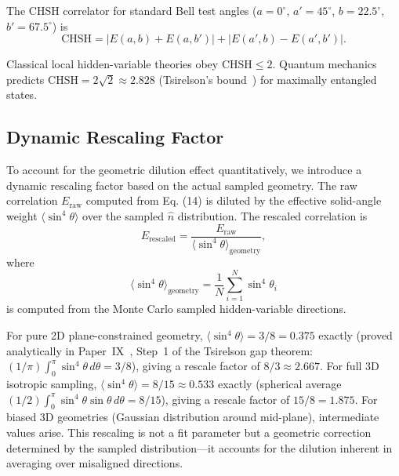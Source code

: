 The CHSH correlator for standard Bell test angles ($a=0^\circ$, $a'=45^\circ$, $b=22.5^\circ$, $b'=67.5^\circ$) is
\begin{equation}
\mathrm{CHSH} = |E(a,b) + E(a,b')| + |E(a',b) - E(a',b')|.
\label{P8:eq:chsh_def}
\end{equation}

Classical local hidden-variable theories obey $\mathrm{CHSH} \leq 2$. Quantum mechanics predicts $\mathrm{CHSH} = 2\sqrt{2} \approx 2.828$ (Tsirelson's bound~\cite{Tsirelson1980}) for maximally entangled states.

\subsection*{Dynamic Rescaling Factor}

To account for the geometric dilution effect quantitatively, we introduce a dynamic rescaling factor based on the actual sampled geometry. The raw correlation $E_{\mathrm{raw}}$ computed from Eq. (14) is diluted by the effective solid-angle weight $\langle \sin^4\theta \rangle$ over the sampled $\hat{n}$ distribution. The rescaled correlation is
\begin{equation}
E_{\mathrm{rescaled}} = \frac{E_{\mathrm{raw}}}{\langle \sin^4\theta \rangle_{\mathrm{geometry}}},
\label{P8:eq:E_rescaled}
\end{equation}
where
\begin{equation}
\langle \sin^4\theta \rangle_{\mathrm{geometry}} = \frac{1}{N} \sum_{i=1}^N \sin^4\theta_i
\label{P8:eq:sin4_geometry_avg}
\end{equation}
is computed from the Monte Carlo sampled hidden-variable directions.

For pure 2D plane-constrained geometry, $\langle \sin^4\theta \rangle = 3/8 = 0.375$ exactly
(proved analytically in Paper~IX~\cite{Paper9}, Step~1 of the Tsirelson gap theorem:
$(1/\pi)\int_0^\pi\sin^4\theta\,d\theta = 3/8$), giving a rescale factor of $8/3\approx2.667$.
For full 3D isotropic sampling,
$\langle \sin^4\theta \rangle = 8/15 \approx 0.533$ exactly
(spherical average $(1/2)\int_0^\pi\sin^4\theta\sin\theta\,d\theta = 8/15$),
giving a rescale factor of $15/8 = 1.875$.
For biased 3D geometries (Gaussian distribution around mid-plane), intermediate values arise.
This rescaling is not a fit parameter but a geometric correction determined by the sampled
distribution---it accounts for the dilution inherent in averaging over misaligned directions.

